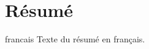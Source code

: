 \chapter*{Résumé}

\begin{otherlanguage*}{francais}
  Texte du résumé en français.
\end{otherlanguage*}
